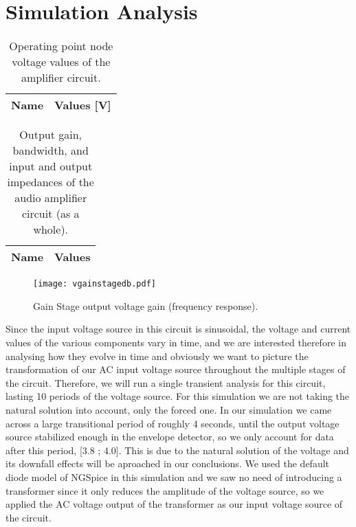 \newpage
\section{Simulation Analysis}
\label{sec:simulation}

\begin{table}[h]
  \centering
  \begin{tabular}{|l|r|}
    \hline    
    {\bf Name} & {\bf Values [V]} \\ \hline
     
  \end{tabular}
  \caption{Operating point node voltage values of the amplifier circuit.}
  \label{tab:operator}
\end{table}

\begin{table}[h]
  \centering
  \begin{tabular}{|l|r|}
    \hline    
    {\bf Name} & {\bf Values} \\ \hline
    
         
  \end{tabular}
  \caption{Output gain, bandwidth, and input and output impedances of the audio amplifier circuit (as a whole).}
  \label{tab:main}
\end{table}

\begin{figure}[!h] \centering
\texttt{[image: vgainstagedb.pdf]}
\caption{Gain Stage output voltage gain (frequency response).}
\label{fig:gainstage}
\end{figure}




Since the input voltage source in this circuit is sinusoidal, the voltage and current values of the various components vary in time, and we are interested therefore in analysing how they evolve in time and obviously we want to picture the transformation of our AC input voltage source throughout the multiple stages of the circuit. Therefore, we will run a single transient analysis for this circuit, lasting 10 periods of the voltage source. For this simulation we are not taking the natural solution into account, only the forced one. In our simulation we came across a large transitional period of roughly 4 seconds, until the output voltage source stabilized enough in the envelope detector, so we only account for data after this period, [3.8 ; 4.0]. This is due to the natural solution of the voltage and its downfall effects will be aproached in our conclusions. We used the default diode model of NGSpice in this simulation and we saw no need of introducing a transformer since it only reduces the amplitude of the voltage source, so we applied the AC voltage output of the transformer as our input voltage source of the circuit.
